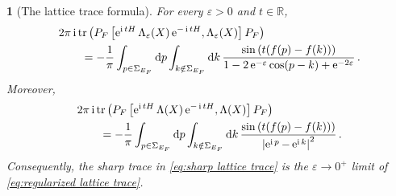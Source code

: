\documentclass[10pt,a4paper]{amsart}
\newtheorem{lem}{}
\newcommand{\RR}{\mathbb{R}}
\newcommand{\dif}{\operatorname{d}\!} %
\newcommand{\ee}{\operatorname{e}}
\newcommand{\eql}[1]{\begin{align}#1\end{align}}
\newcommand{\ii}{\operatorname{i}}
\newcommand{\tr}{\operatorname{tr}}
\newcommand{\ve}{\varepsilon}
\begin{document}
\begin{lem}[The lattice trace formula]\label{lem:lattice trace formula}
For every $\ve>0$ and $t\in\RR$,
\eql{&2\pi\ii\tr\left(
P_F\left[
\ee^{\ii tH}\Lambda_\ve(X)\ee^{-\ii tH},
\Lambda_\ve(X)
\right]P_F
\right)\notag\\
&\qquad=
-\frac{1}{\pi}
\int_{p\in\Sigma_{E_F}}\dif{p}
\int_{k\notin\Sigma_{E_F}}\dif{k}\,
\frac{\sin\left(t(f(p)-f(k))\right)}
{1-2\ee^{-\ve}\cos(p-k)+\ee^{-2\ve}}\,.
\label{eq:regularized lattice trace}}
Moreover,
\eql{&2\pi\ii\tr\left(
P_F\left[
\ee^{\ii tH}\Lambda(X)\ee^{-\ii tH},
\Lambda(X)
\right]P_F
\right)\notag\\
&\qquad=
-\frac{1}{\pi}
\int_{p\in\Sigma_{E_F}}\dif{p}
\int_{k\notin\Sigma_{E_F}}\dif{k}\,
\frac{\sin\left(t(f(p)-f(k))\right)}
{\left|\ee^{\ii p}-\ee^{\ii k}\right|^2}\,.
\label{eq:sharp lattice trace}}
Consequently, the sharp trace in \cref{eq:sharp lattice trace} is the
$\ve\to0^+$ limit of \cref{eq:regularized lattice trace}.
\end{lem}
\end{document}
